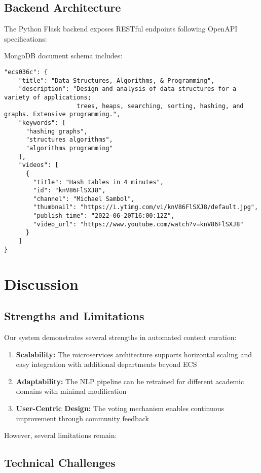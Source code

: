 \documentclass[manuscript,nonacm]{acmart}
\begin{document}
\subsection{Backend Architecture}

The Python Flask backend exposes RESTful endpoints following OpenAPI specifications:

MongoDB document schema includes:
\begin{verbatim}
"ecs036c": {
    "title": "Data Structures, Algorithms, & Programming",
    "description": "Design and analysis of data structures for a variety of applications;
                    trees, heaps, searching, sorting, hashing, and graphs. Extensive programming.",
    "keywords": [
      "hashing graphs",
      "structures algorithms",
      "algorithms programming"
    ],
    "videos": [
      {
        "title": "Hash tables in 4 minutes",
        "id": "knV86FlSXJ8",
        "channel": "Michael Sambol",
        "thumbnail": "https://i.ytimg.com/vi/knV86FlSXJ8/default.jpg",
        "publish_time": "2022-06-20T16:00:12Z",
        "video_url": "https://www.youtube.com/watch?v=knV86FlSXJ8"
      }
    ]
}
\end{verbatim}

\section{Discussion}

\subsection{Strengths and Limitations}

Our system demonstrates several strengths in automated content curation:

\begin{enumerate}
    \item \textbf{Scalability:} The microservices architecture supports horizontal scaling and easy integration with additional departments beyond ECS
    \item \textbf{Adaptability:} The NLP pipeline can be retrained for different academic domains with minimal modification
    \item \textbf{User-Centric Design:} The voting mechanism enables continuous improvement through community feedback
\end{enumerate}

However, several limitations remain:

\subsection{Technical Challenges}
\end{document}
